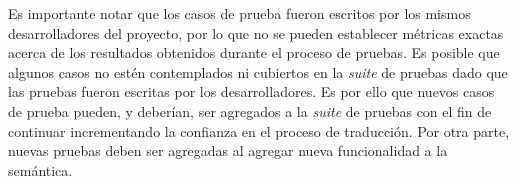 Es importante notar que los casos de prueba fueron escritos por los mismos desarrolladores del proyecto, por lo que no se pueden establecer métricas exactas acerca de los resultados obtenidos durante el proceso de pruebas.
Es posible que algunos casos no estén contemplados ni cubiertos en la \textit{suite} de pruebas dado que las pruebas fueron escritas por los desarrolladores.
Es por ello que nuevos casos de prueba pueden, y deberían, ser agregados a la \textit{suite} de pruebas con el fin de continuar incrementando la confianza en el proceso de traducción.
Por otra parte, nuevas pruebas deben ser agregadas al agregar nueva funcionalidad a la semántica.